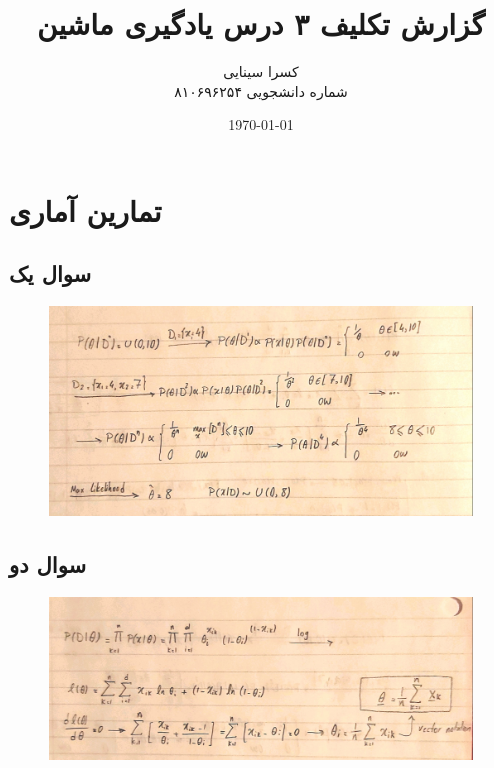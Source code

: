 \documentclass[12pt,onecolumn,a4paper]{article}
\begin{document}
\title{گزارش تکلیف ۳ درس یادگیری ماشین} 
\author{کسرا سینایی\\
شماره دانشجویی ۸۱۰۶۹۶۲۵۴\\
}
\date{\today}
\maketitle
\thispagestyle{empty}
\newpage

\section{تمارین آماری}

\subsection{سوال یک}
\begin{figure}[h!]
    \includegraphics[width=\linewidth]{q1.jpg}    
\end{figure}

\subsection{سوال دو}
\begin{figure}[h!]
    \includegraphics[width=\linewidth]{q2.jpg}    
\end{figure}
\newpage
\end{document}
